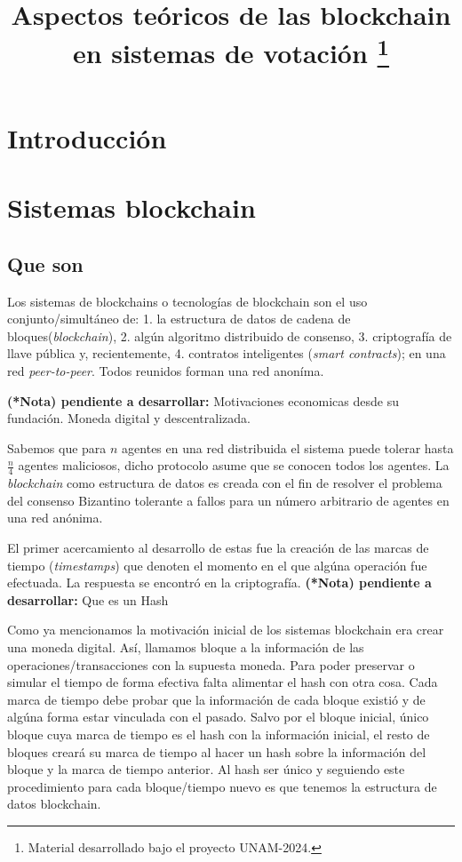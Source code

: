 \documentclass[14pt,letterpaper]{article}
\author{}
\date{}
\title{Aspectos teóricos de las blockchain en sistemas de votación
\thanks{\small{Material desarrollado bajo el proyecto UNAM-2024.}}}
\begin{document}
\ttfamily
\maketitle
\rmfamily


\tableofcontents
\newpage

\section{Introducción}

\section{Sistemas blockchain}
\subsection{Que son}
\noindent
Los sistemas de blockchains o tecnologías de blockchain
son el uso conjunto/simultáneo de: 1. la estructura de datos
de cadena de bloques({\it blockchain}), 2. algún algoritmo distribuido de consenso,
3. criptografía de llave pública y, recientemente, 4. contratos
inteligentes ({\it smart contracts}); en una red {\it peer-to-peer}.
Todos reunidos forman una red anoníma.

\footnotesize
{\bf (*Nota) pendiente a desarrollar: }
Motivaciones economicas desde su fundación. Moneda digital y descentralizada.
\normalsize

Sabemos que para $n$ agentes en una red distribuida el sistema puede tolerar hasta
$\frac{n}{4}$ agentes maliciosos, dicho protocolo asume que se conocen
todos los agentes. La {\it blockchain} como estructura de datos es creada con el fin 
de resolver el problema del consenso Bizantino tolerante a fallos
para un número arbitrario de agentes en una red anónima. 

El primer acercamiento al desarrollo de estas fue la creación de las
marcas de tiempo ({\it timestamps}) que denoten el momento en el que
algúna operación fue efectuada. La respuesta se encontró en la
criptografía. {\small {\bf (*Nota) pendiente a desarrollar:} Que es un Hash}

Como ya mencionamos la motivación
inicial de los sistemas blockchain era crear una moneda digital.
Así, llamamos bloque a la información de las operaciones/transacciones
con la supuesta moneda. Para poder preservar o simular el tiempo de forma efectiva
falta alimentar el hash con otra cosa. Cada
marca de tiempo debe probar que la información de cada bloque existió y de algúna forma
estar vinculada con el pasado. Salvo por el bloque inicial, único bloque cuya marca
de tiempo es el hash con la información inicial, el resto de bloques creará
su marca de tiempo al hacer un hash sobre la información del bloque y
la marca de tiempo anterior. Al hash ser único y seguiendo este procedimiento
para cada bloque/tiempo nuevo es que tenemos la estructura de datos blockchain.
\end{document}
